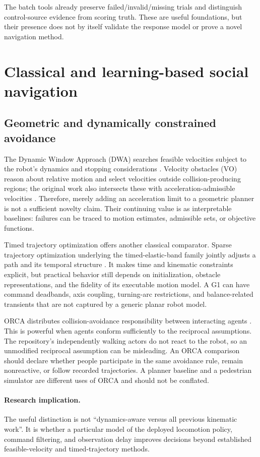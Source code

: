 \documentclass[11pt,a4paper]{article}
\newcommand{\gap}[1]{\paragraph{Research implication.} #1}
\begin{document}
The batch tools already preserve failed/invalid/missing trials and distinguish
control-source evidence from scoring truth. These are useful foundations,
but their presence does not by itself validate the response model or prove
a novel navigation method.

\section{Classical and learning-based social navigation}
\label{sec:navigation}
\subsection{Geometric and dynamically constrained avoidance}
The Dynamic Window Approach (DWA) searches feasible velocities subject to
the robot's dynamics and stopping considerations \citep{dwa}. Velocity
obstacles (VO) reason about relative motion and select velocities outside
collision-producing regions; the original work also intersects these with
acceleration-admissible velocities \citep{vo}. Therefore, merely adding an
acceleration limit to a geometric planner is not a sufficient novelty claim.
Their continuing value is as interpretable baselines: failures can be traced
to motion estimates, admissible sets, or objective functions.

Timed trajectory optimization offers another classical comparator. Sparse
trajectory optimization underlying the timed-elastic-band family jointly
adjusts a path and its temporal structure \citep{teb}. It makes time and
kinematic constraints explicit, but practical behavior still depends on
initialization, obstacle representations, and the fidelity of its executable
motion model. A G1 can have command deadbands, axis coupling, turning-arc
restrictions, and balance-related transients that are not captured by a
generic planar robot model.

ORCA distributes collision-avoidance responsibility between interacting
agents \citep{orca}. This is powerful when agents conform sufficiently to
the reciprocal assumptions. The repository's independently walking actors
do not react to the robot, so an unmodified reciprocal assumption can be
misleading. An ORCA comparison should declare whether people participate
in the same avoidance rule, remain nonreactive, or follow recorded
trajectories. A planner baseline and a pedestrian simulator are different
uses of ORCA and should not be conflated.

\gap{The useful distinction is not ``dynamics-aware versus all previous
kinematic work''. It is whether a particular model of the deployed
locomotion policy, command filtering, and observation delay improves
decisions beyond established feasible-velocity and timed-trajectory methods.}
\end{document}
